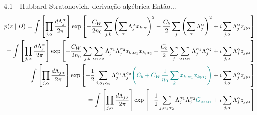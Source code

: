 \documentclass{beamer}
\begin{document}
\begin{frame}{4.1 - Hubbard-Stratonovich, derivação algébrica}
    Então...
    \tiny
    \begin{align*}
    p(z \mid D) = \int \left[ \prod_{j,\alpha} \frac{d\Lambda_{j}^{\alpha}}{2\pi} \right] 
    \exp \left[- \frac{C_W}{2n_0} \sum_{j,k} \left( \sum_\alpha \Lambda_{j}^{\alpha} x_{k;\alpha} \right)^2
    - \frac{C_b}{2} \sum_j \left( \sum_\alpha \Lambda_{j}^{\alpha} \right)^2
    + i \sum_{j,\alpha} \Lambda_{j}^{\alpha} z_{j;\alpha} \right] \\
% 
    = \int \left[ \prod_{j,\alpha} \frac{d\Lambda_{j}^{\alpha}}{2\pi} \right] 
    \exp \left[- \frac{C_W}{2n_0} \sum_{j,k} \sum_{\alpha_1\alpha_2} \Lambda_{j}^{\alpha_1}\Lambda_{j}^{\alpha_2} x_{k;\alpha_1} x_{k;\alpha_2} 
    - \frac{C_b}{2} \sum_j \sum_{\alpha_1\alpha_2} \Lambda_{j}^{\alpha_1}\Lambda_{j}^{\alpha_2}
    + i \sum_{j,\alpha} \Lambda_{j}^{\alpha} z_{j;\alpha} \right] \\
% 
    = \int \left[ \prod_{j,\alpha} \frac{d\Lambda_{j\alpha}}{2\pi} \right] 
    \exp \left[- \frac{1}{2} \sum_{j,\alpha_1\alpha_2} \Lambda_{j}^{\alpha_1}\Lambda_{j}^{\alpha_2} \textcolor{teal}{\left(C_b + C_W \frac{1}{n_0}\sum_k x_{k;\alpha_1} x_{k;\alpha_2} \right)}
    + i \sum_{j,\alpha} \Lambda_{j}^{\alpha} z_{j;\alpha} \right] \\
% 
    =  \int \left[ \prod_{j,\alpha} \frac{d\Lambda_{j\alpha}}{2\pi} \right] 
    \exp \left[- \frac{1}{2} \sum_{j,\alpha_1\alpha_2} \Lambda_{j}^{\alpha_1}\Lambda_{j}^{\alpha_2} \textcolor{teal}{G_{\alpha_1\alpha_2}}
    + i \sum_{j,\alpha} \Lambda_{j}^{\alpha} z_{j;\alpha} \right] \\
    \end{align*}
\end{frame}
\end{document}
